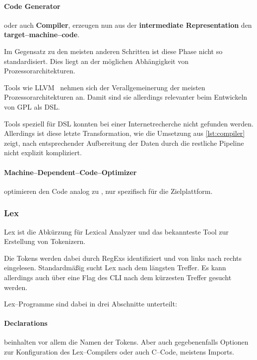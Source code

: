 \paragraph{Code Generator} oder auch \textbf{Compiler}, erzeugen nun aus der \textbf{intermediate Representation} den \textbf{target--machine--code}.

Im Gegensatz zu den meisten anderen Schritten ist diese Phase nicht so standardisiert.
Dies liegt an der möglichen Abhängigkeit von Prozessorarchitekturen.

Tools wie \ac{LLVM}~\autocite{llvm-project-2024} nehmen sich der Verallgemeinerung der meisten Prozessorarchitekturen an.
Damit sind sie allerdings relevanter beim Entwickeln von \ac{GPL} als \ac{DSL}.

Tools speziell für \ac{DSL} konnten bei einer Internetrecherche nicht gefunden werden.
Allerdings ist diese letzte Transformation, wie die Umsetzung aus \autoref{lst:compiler} zeigt, nach entsprechender Aufbereitung der Daten durch die restliche Pipeline nicht explizit kompliziert.

\paragraph{Machine--Dependent--Code--Optimizer} optimieren den Code analog zu , nur spezifisch für die Zielplattform.

\subsubsection{Lex}\label{subsubsec:lex}
Lex ist die Abkürzung für Lexical Analyzer und das bekannteste Tool zur Erstellung von Tokenizern.

Die Tokens werden dabei durch \acp{RegEx} identifiziert und von links nach rechts eingelesen.
Standardmäßig sucht Lex nach dem längsten Treffer.
Es kann allerdings auch über eine Flag des \ac{CLI} nach dem kürzesten Treffer gesucht werden.

Lex--Programme sind dabei in drei Abschnitte unterteilt:~\autocite{debray-no-date}


\paragraph{Declarations} beinhalten vor allem die Namen der Tokens.
Aber auch gegebenenfalls Optionen zur Konfiguration des Lex--Compilers oder auch C--Code, meistens Imports.

